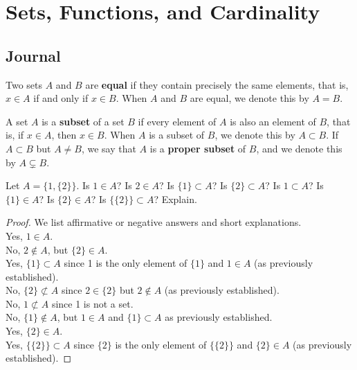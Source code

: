 \documentclass[../main.tex]{subfiles}
\begin{document}
\chapter{Sets, Functions, and Cardinality}\label{sct:1}
\section{Journal}
\begin{definition}\label{dfn:1.2}
    Two sets $A$ and $B$ are \textbf{equal} if they contain precisely the same elements, that is, $x\in A$ if and only if $x\in B$. When $A$ and $B$ are equal, we denote this by $A=B$.
\end{definition}

\begin{definition}\label{dfn:1.3}
    A set $A$ is a \textbf{subset} of a set $B$ if every element of $A$ is also an element of $B$, that is, if $x\in A$, then $x\in B$. When $A$ is a subset of $B$, we denote this by $A\subset B$. If $A\subset B$ but $A\neq B$, we say that $A$ is a \textbf{proper subset} of $B$, and we denote this by $A\subsetneq B$.
\end{definition}

\begin{exercise}\label{exr:1.4}
    Let $A=\{1,\{2\}\}$. Is $1\in A$? Is $2\in A$? Is $\{1\}\subset A$? Is $\{2\}\subset A$? Is $1\subset A$? Is $\{1\}\in A$? Is $\{2\}\in A$? Is $\{\{2\}\}\subset A$? Explain.
    \begin{proof}
        We list affirmative or negative answers and short explanations.\\[3pt]
        Yes, $1\in A$.\\
        No, $2\notin A$, but $\{2\}\in A$.\\
        Yes, $\{1\}\subset A$ since 1 is the only element of $\{1\}$ and $1\in A$ (as previously established).\\
        No, $\{2\}\not\subset A$ since $2\in\{2\}$ but $2\notin A$ (as previously established).\\
        No, $1\not\subset A$ since 1 is not a set.\\
        No, $\{1\}\notin A$, but $1\in A$ and $\{1\}\subset A$ as previously established.\\
        Yes, $\{2\}\in A$.\\
        Yes, $\{\{2\}\}\subset A$ since $\{2\}$ is the only element of $\{\{2\}\}$ and $\{2\}\in A$ (as previously established).
    \end{proof}
\end{exercise}
\end{document}
